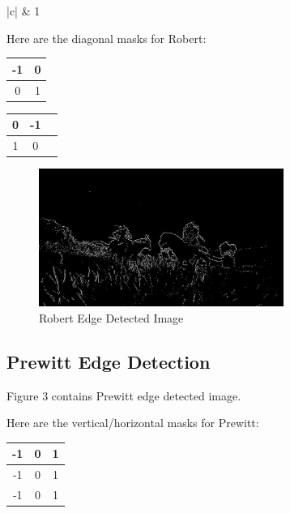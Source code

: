 \documentclass[conference]{IEEEtran}
\begin{document}
\begin{center}
\begin{tabular}{ |c| } 
 & 1 \\ \hline
\end{tabular}
\end{center}

Here are the diagonal masks for Robert:

\begin{center}
\begin{tabular}{ |c|c| } 
\hline
-1 & 0 \\ \hline
0 & 1 \\ \hline
\end{tabular}
\end{center}

\begin{center}
\begin{tabular}{ |c|c|c| } 
\hline
0 & -1 \\ \hline
1 & 0 \\ \hline
\end{tabular}
\end{center}

\begin{figure}[htbp]
    \centering
    \includegraphics[width=8cm, height=4.5cm]{images/eldenring_robert.jpg}
    \caption{Robert Edge Detected Image}
\end{figure}

\subsection{Prewitt Edge Detection}

Figure 3 contains Prewitt edge detected image.

Here are the vertical/horizontal masks for Prewitt:

\begin{center}
\begin{tabular}{ |c|c|c| } 
\hline
-1 & 0 & 1 \\ \hline
-1 & 0 & 1 \\ \hline
-1 & 0 & 1 \\ \hline
\end{tabular}
\end{center}
\end{document}
